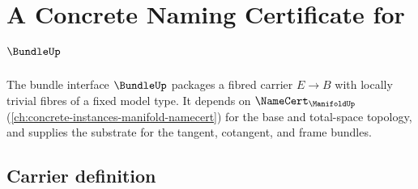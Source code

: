 \chapter{A Concrete Naming Certificate for $\BundleUp$}
\label{ch:concrete-instances-bundle-namecert}

The bundle interface $\BundleUp$ packages a fibred carrier $E \to B$ with locally trivial fibres of a fixed model type. It depends on $\NameCert_{\ManifoldUp}$ (\autoref{ch:concrete-instances-manifold-namecert}) for the base and total-space topology, and supplies the substrate for the tangent, cotangent, and frame bundles.

\section{Carrier definition}
\label{sec:bundle-carrier}

